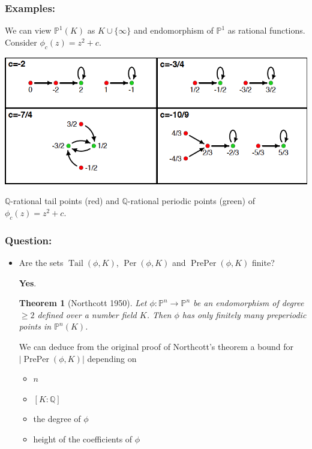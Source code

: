 \documentclass{beamer}
\def\PP{{\mathbb P}}
\def\QQ{{\mathbb Q}}
\DeclareMathOperator{\Tail}{Tail}
\DeclareMathOperator{\Per}{Per}
\DeclareMathOperator{\PrePer}{PrePer}
\theoremstyle{thmstyle}
\theoremstyle{thmstyle}
\newtheorem*{mythm}{Theorem}
\theoremstyle{mystyle}
\theoremstyle{qstnstyle}
\begin{document}
\begin{frame}
\frametitle{Examples:}
We can view $\PP^1(K)$ as $K\cup \{\infty \}$ and endomorphism of $\PP^1$ as rational functions. Consider $\phi_c(z)=z^2+c$.
\pause

\begin{center}
\includegraphics[width=1.0\linewidth]{placeholder4}
\end{center}

$\QQ$-rational tail points (red) and $\QQ$-rational periodic points (green) of  $\phi_c(z)=z^2+c$.
\end{frame}

\begin{frame}
\frametitle{Question:}
\begin{itemize}
\item Are the sets $\Tail(\phi,K)$, $\Per(\phi,K)$ and $\PrePer(\phi,K)$ finite? 

\pause \textbf{Yes}. 
\vspace{6mm}\pause

\begin{mythm}[Northcott 1950]
Let $\phi : \PP^n \to \PP^n$ be an endomorphism of degree $\geq{2}$
defined over a number field $K$. Then $\phi$ has
only finitely many preperiodic points in $\PP^n(K)$.
\end{mythm}

\vspace{6mm} \pause
We can deduce from the original proof of Northcott's theorem  a bound for $|\PrePer(\phi,K)|$ depending on
\begin{itemize}
\item $n$
\item $[K:\QQ]$
\item the degree of $\phi$
\item height of the coefficients of $\phi$
\end{itemize}

 
\end{itemize}
\end{frame}
\end{document}
